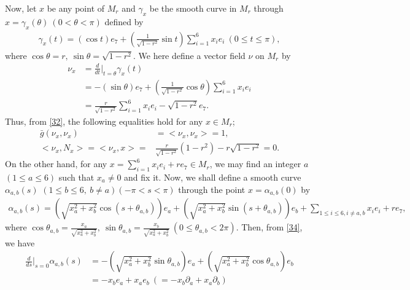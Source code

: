 \documentclass[12pt]{article}
\numberwithin{equation}{section}
\begin{document}
Now, let $x$ be any point of $M_{r}$ and $\gamma_{x}$ be the smooth curve in $M_{r}$ through $x=\gamma_{x}(\theta)~(0<\theta<\pi)$ defined by
\begin{equation}\label{31}
\begin{split}
\gamma_{x}(t)=(\cos t)e_{7}+(\frac{1}{\sqrt{1-r^{2}}}\sin t)\sum_{i=1}^{6}x_{i}e_{i}~(0\leq t \leq \pi),
\end{split}
\end{equation}
where $\cos\theta=r,~\sin\theta=\sqrt{1-r^{2}}$. We here define a vector field $\nu$ on $M_r$ by
\begin{equation}\label{32}
\begin{split}
\nu_{x}&=\frac{d}{dt}|_{t=\theta}\gamma_{x}(t)\\&=-(\sin\theta)e_{7}+(\frac{1}{\sqrt{1-r^{2}}}\cos\theta)\sum_{i=1}^{6}x_{i}e_{i}
\\&=\frac{r}{\sqrt{1-r^{2}}}\sum_{i=1}^{6}x_{i}e_{i}-\sqrt{1-r^{2}}e_{7}.
\end{split}
\end{equation}
Thus, from \eqref{32}, the following equalities hold  for any $x\in M_{r}$;\\
\begin{equation}\label{33}
\begin{split}
\bar{g}(\nu_{x},\nu_{x})&=<\nu_{x},\nu_{x}>=1,\\
<\nu_{x},N_{x}>=<\nu_{x},x>=&\frac{r}{\sqrt{1-r^{2}}}(1-r^{2})-r\sqrt{1-r^{2}}=0.
\end{split}
\end{equation}
On the other hand, for any $x=\sum_{i=1}^{6}x_{i}e_{i}+re_{7}\in M_{r}$, we may find an integer
$a$ $(1\leq a\leq 6)$ such that $x_{a}\neq 0$ and fix it. Now, we
shall define a smooth curve $\alpha_{a,b}(s)$ $(1\leq b \leq 6,~ b\ne a)(-\pi<s<\pi) $ through the point $x = \alpha_{a,b}(0)$ by
\begin{equation}\label{34}
\begin{split}
\alpha_{a,b}(s)=(\sqrt{x_{a}^{2}+x_{b}^{2}}\cos(s+\theta_{a,b}))e_{a} +(\sqrt{x_{a}^{2}+x_{b}^{2}}\sin(s+\theta_{a,b}))e_{b}+{
{\sum_{1 \leq i \leq 6,i\neq a,b}x_ie_i+re_7}},
\end{split}
\end{equation}
where $\cos\theta_{a,b}=\frac{x_{a}}{\sqrt{x_{a}^{2}+x_{b}^{2}}},~\sin\theta_{a,b}=\frac{x_{b}}{\sqrt{x_{a}^{2}+x_{b}^{2}}}~(0\leq\theta_{a,b}<2\pi)$.
Then, from \eqref{34}, we have
\begin{equation}\label{35}
\begin{split}
\frac{d}{ds}|_{s=0}\alpha_{a,b}(s)&=-(\sqrt{x_{a}^{2}+x_{b}^{2}}\sin\theta_{a,b})e_{a}+(\sqrt{x_{a}^{2}+x_{b}^{2}}\cos\theta_{a,b})e_{b}\\&=-x_{b} e_{a} + x_{a} e_{b}~(=- x_{b} \partial_{a}+x_{a}\partial_{b})
\end{split}
\end{equation}
\end{document}
